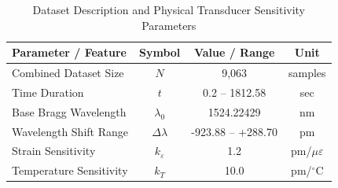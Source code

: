 \begin{table}[h]
\centering
\caption{Dataset Description and Physical Transducer Sensitivity Parameters}
\label{tab:dataset_desc}
\begin{tabular}{lccc}
\hline
\textbf{Parameter / Feature} & \textbf{Symbol} & \textbf{Value / Range} & \textbf{Unit} \\ \hline
Combined Dataset Size & $N$ & 9,063 & samples \\
Time Duration & $t$ & 0.2 -- 1812.58 & sec \\
Base Bragg Wavelength & $\lambda_0$ & 1524.22429 & nm \\
Wavelength Shift Range & $\Delta\lambda$ & -923.88 -- +288.70 & pm \\
Strain Sensitivity & $k_\varepsilon$ & 1.2 & pm/$\mu\varepsilon$ \\
Temperature Sensitivity & $k_T$ & 10.0 & pm/$^\circ$C \\ \hline
\end{tabular}
\end{table}